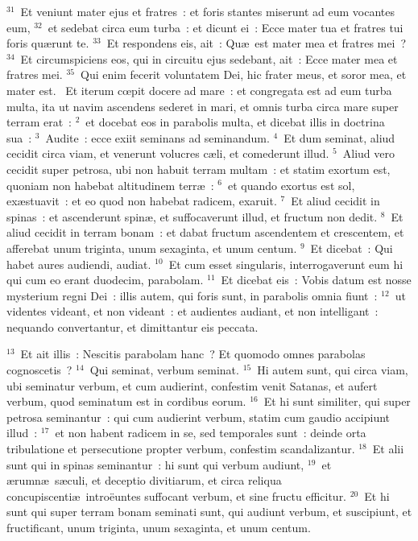 ${}^{31}$~Et veniunt mater ejus et fratres~: et foris stantes miserunt ad eum vocantes eum,
${}^{32}$~et sedebat circa eum turba~: et dicunt ei~: Ecce mater tua et fratres tui foris qu\ae runt te.
${}^{33}$~Et respondens eis, ait~: Qu\ae\ est mater mea et fratres mei~?
${}^{34}$~Et circumspiciens eos, qui in circuitu ejus sedebant, ait~: Ecce mater mea et fratres mei.
${}^{35}$~Qui enim fecerit voluntatem Dei, hic frater meus, et soror mea, et mater est.
~Et iterum cœpit docere ad mare~: et congregata est ad eum turba multa, ita ut navim ascendens sederet in mari, et omnis turba circa mare super terram erat~:
${}^{2}$~et docebat eos in parabolis multa, et dicebat illis in doctrina sua~:
${}^{3}$~Audite~: ecce exiit seminans ad seminandum.
${}^{4}$~Et dum seminat, aliud cecidit circa viam, et venerunt volucres c\ae li, et comederunt illud.
${}^{5}$~Aliud vero cecidit super petrosa, ubi non habuit terram multam~: et statim exortum est, quoniam non habebat altitudinem terr\ae~:
${}^{6}$~et quando exortus est sol, ex\ae stuavit~: et eo quod non habebat radicem, exaruit.
${}^{7}$~Et aliud cecidit in spinas~: et ascenderunt spin\ae , et suffocaverunt illud, et fructum non dedit.
${}^{8}$~Et aliud cecidit in terram bonam~: et dabat fructum ascendentem et crescentem, et afferebat unum triginta, unum sexaginta, et unum centum.
${}^{9}$~Et dicebat~: Qui habet aures audiendi, audiat.
${}^{10}$~Et cum esset singularis, interrogaverunt eum hi qui cum eo erant duodecim, parabolam.
${}^{11}$~Et dicebat eis~: Vobis datum est nosse mysterium regni Dei~: illis autem, qui foris sunt, in parabolis omnia fiunt~:
${}^{12}$~ut videntes videant, et non videant~: et audientes audiant, et non intelligant~: nequando convertantur, et dimittantur eis peccata.


${}^{13}$~Et ait illis~: Nescitis parabolam hanc~? Et quomodo omnes parabolas cognoscetis~?
${}^{14}$~Qui seminat, verbum seminat.
${}^{15}$~Hi autem sunt, qui circa viam, ubi seminatur verbum, et cum audierint, confestim venit Satanas, et aufert verbum, quod seminatum est in cordibus eorum.
${}^{16}$~Et hi sunt similiter, qui super petrosa seminantur~: qui cum audierint verbum, statim cum gaudio accipiunt illud~:
${}^{17}$~et non habent radicem in se, sed temporales sunt~: deinde orta tribulatione et persecutione propter verbum, confestim scandalizantur.
${}^{18}$~Et alii sunt qui in spinas seminantur~: hi sunt qui verbum audiunt,
${}^{19}$~et \ae rumn\ae\ s\ae culi, et deceptio divitiarum, et circa reliqua concupiscenti\ae\ intro\"euntes suffocant verbum, et sine fructu efficitur.
${}^{20}$~Et hi sunt qui super terram bonam seminati sunt, qui audiunt verbum, et suscipiunt, et fructificant, unum triginta, unum sexaginta, et unum centum.


